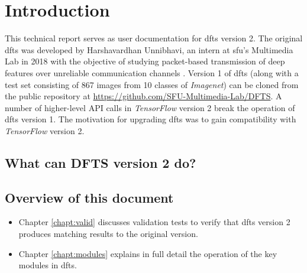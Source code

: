 \chapter{Introduction} \label{chapter:intro}
This technical report serves as user documentation for \gls{dfts} version 2. The original \gls{dfts} was developed by Harshavardhan Unnibhavi, an intern at \gls{sfu}'s Multimedia Lab in 2018 with the objective of studying packet-based transmission of deep features over unreliable communication channels \cite{unnibhavi2018dfts}. Version 1 of \gls{dfts} (along with a test set consisting of 867 images from 10 classes of \textit{Imagenet}) can be cloned from the public repository at \url{https://github.com/SFU-Multimedia-Lab/DFTS}. A number of higher-level API calls in \textit{TensorFlow} version 2 break the operation of \gls{dfts} version 1. The motivation for upgrading \gls{dfts} was to gain compatibility with \textit{TensorFlow} version 2.

\section{What can DFTS version 2 do?}

\section{Overview of this document}
\begin{itemize}
	\item Chapter \ref{chapt:valid} discusses validation tests to verify that \gls{dfts} version 2 produces matching results to the original version.
	\item Chapter \ref{chapt:modules} explains in full detail the operation of the key modules in \gls{dfts}.
\end{itemize}